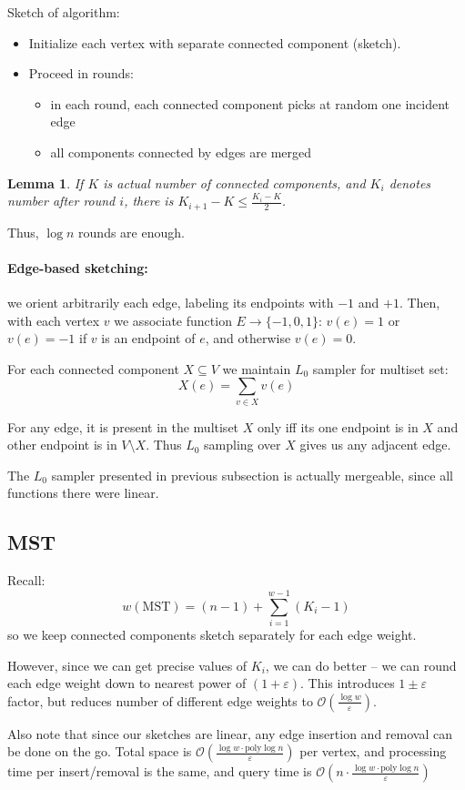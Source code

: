 \documentclass[11pt]{article}
\newtheorem{lemma}[theorem]{Lemma}
\newcommand{\bigo}{\mathcal{O}}
\begin{document}
Sketch of algorithm:
\begin{itemize}
\item Initialize each vertex with separate connected component (sketch).
\item Proceed in rounds: 
\begin{itemize}
\item in each round, each connected component picks at random one incident edge
\item all components connected by edges are merged
\end{itemize}
\end{itemize}

\begin{lemma}
If $K$ is actual number of connected components, and $K_i$ denotes number after round $i$, there is $K_{i+1} - K \le \frac{K_i - K}{2}$.
\end{lemma}
Thus, $\log n$ rounds are enough.

\paragraph{Edge-based sketching:} we orient arbitrarily each edge, labeling its endpoints with $-1$ and $+1$.
Then, with each vertex $v$ we associate function $E \to \{-1,0,1\}$: $v(e) = 1$ or $v(e) = -1$ if $v$ is an endpoint of $e$, and otherwise $v(e) = 0$.

For each connected component $X \subseteq V$ we maintain $L_0$ sampler for multiset set:
$$X(e) = \sum_{v \in X} v(e)$$

For any edge, it is present in the multiset $X$ only iff its one endpoint is in $X$ and other endpoint is in $V \setminus X$. Thus $L_0$ sampling over $X$ gives us any adjacent edge.

The $L_0$ sampler presented in previous subsection is actually mergeable, since all functions there were linear.

\subsection{MST}
Recall: 
$$w(\text{MST}) = (n-1) + \sum_{i=1}^{w-1} (K_i - 1)$$
so we keep connected components sketch separately for each edge weight.

However, since we can get precise values of $K_i$, we can do better -- we can round each edge weight down to nearest power of $(1+\varepsilon)$. This introduces $1 \pm \varepsilon$ factor, but reduces number of different edge weights to $\bigo(\frac{\log w}{\varepsilon})$.

Also note that since our sketches are linear, any edge insertion and removal can be done on the go. Total space is $\bigo(\frac{\log w \cdot \text{poly} \log n}{\varepsilon})$ per vertex, and processing time per insert/removal is the same, and query time is $\bigo(n \cdot \frac{\log w \cdot \text{poly} \log n}{\varepsilon})$ 



\end{document}
